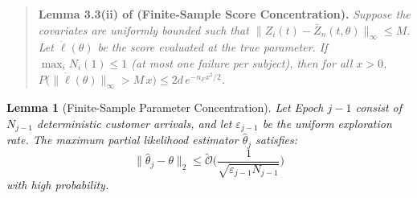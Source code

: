 \documentclass[letterpaper, 10 pt, conference]{IEEEconf}
\newtheorem{lemma}{Lemma}
\newcommand{\what}[1]{\widehat{#1}}
\begin{document}
\begin{quote}
\textbf{Lemma 3.3(ii) of \cite{huang2013} (Finite-Sample Score Concentration).} \textit{Suppose the covariates are uniformly bounded such that $\|Z_i(t) - \bar{Z}_{n}(t, \theta)\|_\infty \leq M$. Let $\dot{\ell}(\theta)$ be the score evaluated at the true parameter. If $\max_i N_i(1) \leq 1$ (at most one failure per subject), then for all $x > 0$, $P\!\big(\|\dot{\ell}(\theta)\|_\infty > M\,x\big) \leq 2d\,e^{-n_F x^2/2}$.}
\end{quote}

\begin{lemma}[Finite-Sample Parameter Concentration]
    \label{lem:theta_concentration}
    Let Epoch $j-1$ consist of $N_{j-1}$ deterministic customer arrivals, and let $\varepsilon_{j-1}$ be the uniform exploration rate. The maximum partial likelihood estimator $\what{\theta}_j$ satisfies:
    \begin{equation}
        \|\what{\theta}_j - \theta\|_2 \le \widetilde{\mathcal{O}}\Bigg(\frac{1}{\sqrt{\varepsilon_{j-1} N_{j-1}}}\Bigg)
    \end{equation}
    with high probability.
\end{lemma}
\end{document}
